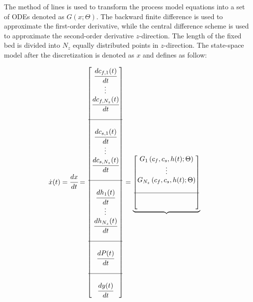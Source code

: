 \documentclass[../Article_Model_Parameters.tex]{subfiles}
\begin{document}
			The method of lines is used to transform the process model equations into a set of ODEs denoted as $G(x;\Theta)$. The backward finite difference is used to approximate the first-order derivative, while the central difference scheme is used to approximate the second-order derivative $z$-direction. The length of the fixed bed is divided into $N_z$ equally distributed points in $z$-direction. The state-space model after the discretization is denoted as $x$ and defines as follow:
			
				{\footnotesize
					\begin{align*} \label{discretization}
						\dot{{\color{black}x}}(t) &= \cfrac{d x}{d t} = 
						\begin{bmatrix}
							\cfrac{d {\color{black}c_{f,1}}(t)}{d t} 	  \\
							\vdots					  \\
							\cfrac{d {\color{black}c_{f,N_z}}(t)}{d t} \\
							\\ \hline \\
							\cfrac{d {\color{black}c_{s,1}}(t)}{d t} 	  \\
							\vdots					  \\
							\cfrac{d {\color{black}c_{s,N_z}}(t)}{d t} \\
							\\ \hline \\
							\cfrac{d {\color{black}h_1}(t)}{d t} 	  \\
							\vdots 					  \\
							\cfrac{d {\color{black}h_{N_z}}(t)}{d t} \\
							\\ \hline \\
							\cfrac{d {\color{black}P}(t)}{d t} \\
							\\ \hline \\
							\cfrac{d {\color{black}y}(t)}{d t}
						\end{bmatrix}
						=
						\underbrace{\begin{bmatrix}
								{\color{black}G_1} \left( c_f,c_s,{\color{black}h}(t); \Theta \right)\\ 
								\vdots\\ 
								{\color{black}G_{N_z}} \left( c_f,c_s,{\color{black}h}(t); \Theta \right)\\ 
								\\ \hline \\ \\

\end{bmatrix}}
\end{align*}}
\end{document}
